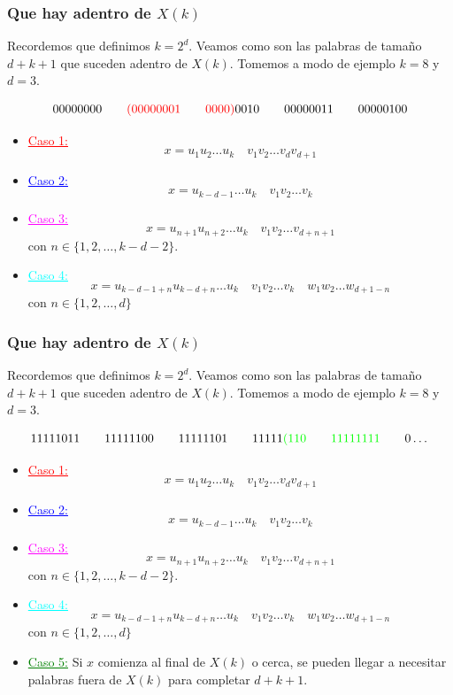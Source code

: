 \documentclass[10pt,mathserif]{beamer}%
\begin{document}
\begin{frame}
  \frametitle{Que hay adentro de $X(k)$}
  Recordemos que definimos $k = 2^d$.
  Veamos como son las palabras de tamaño $d + k + 1$ que suceden adentro de $X(k)$. Tomemos a modo de ejemplo $k = 8$ y $d = 3$.

  $$00000000 \qquad \textcolor{red}{(00000001 \qquad 0000)} 0010 \qquad 00000011 \qquad 00000100 $$

    \begin{itemize}
    \item \textcolor{red}{\underline{Caso 1:}}
    $$x = u_1 u_2 \dots u_k \quad v_1 v_2 \dots v_{d} v_{d + 1}$$
    \item \textcolor{blue}{\underline{Caso 2:}}
    $$ x = u_{k-d-1} \dots u_k \quad v_1 v_2 \dots v_k$$
    \item \textcolor{magenta}{\underline{Caso 3:}}
    $$x = u_{n+1} u_{n+2} \dots u_k \quad  v_1 v_2 \dots v_{d+n+1} $$
    con $n \in \{1,2,\dots ,k - d - 2\}$.
    \item \textcolor{cyan}{\underline{Caso 4:}}
    $$ x = u_{k-d-1+n} u_{k-d+n} \dots u_k \quad v_1 v_2 \dots v_k \quad w_1 w_2 \dots w_{d+1-n}$$
    con $n \in \{1, 2, \dots , d\}$
  \end{itemize}
\end{frame} 

\begin{frame}
  \frametitle{Que hay adentro de $X(k)$}
  Recordemos que definimos $k = 2^d$.
  Veamos como son las palabras de tamaño $d + k + 1$ que suceden adentro de $X(k)$. Tomemos a modo de ejemplo $k = 8$ y $d = 3$.

  $$11111011 \qquad 11111100 \qquad 11111101 \qquad 11111\textcolor{green}{(110 \qquad 11111111} \qquad 0\dots $$

    \begin{itemize}
    \item \textcolor{red}{\underline{Caso 1:}}
    $$x = u_1 u_2 \dots u_k \quad v_1 v_2 \dots v_{d} v_{d + 1}$$
    \item \textcolor{blue}{\underline{Caso 2:}}
    $$ x = u_{k-d-1} \dots u_k \quad v_1 v_2 \dots v_k$$
    \item \textcolor{magenta}{\underline{Caso 3:}}
    $$x = u_{n+1} u_{n+2} \dots u_k \quad  v_1 v_2 \dots v_{d+n+1} $$
    con $n \in \{1,2,\dots ,k - d - 2\}$.
    \item \textcolor{cyan}{\underline{Caso 4:}}
    $$ x = u_{k-d-1+n} u_{k-d+n} \dots u_k \quad v_1 v_2 \dots v_k \quad w_1 w_2 \dots w_{d+1-n}$$
    con $n \in \{1, 2, \dots , d\}$
    \item \textcolor{green}{\underline{Caso 5:}}
    Si $x$ comienza al final de $X(k)$ o cerca, se pueden llegar a necesitar palabras fuera de $X(k)$ para completar $d+k+1$.
  \end{itemize}
\end{frame} 
\end{document}
